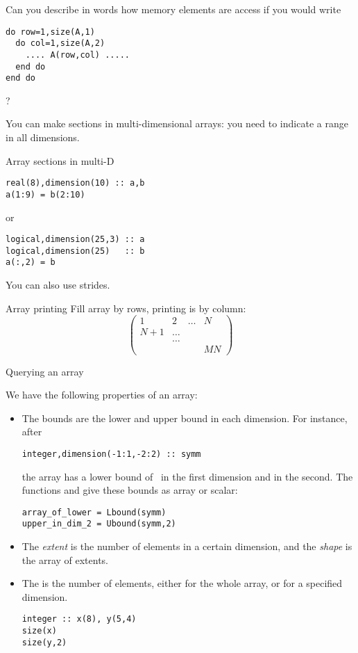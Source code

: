 \begin{exercise}
  Can you describe in words how memory elements are access if you
  would write
\begin{lstlisting}
do row=1,size(A,1)
  do col=1,size(A,2)
    .... A(row,col) .....
  end do
end do
\end{lstlisting}
?
\end{exercise}

You can make sections in multi-dimensional arrays: you need to
indicate a range in all dimensions.

\begin{block}{Array sections in multi-D}
  \label{sl:farray-sectiond}
\begin{lstlisting}
real(8),dimension(10) :: a,b
a(1:9) = b(2:10)
\end{lstlisting}
or
\begin{lstlisting}
logical,dimension(25,3) :: a
logical,dimension(25)   :: b
a(:,2) = b
\end{lstlisting}
You can also use strides.
\end{block}

\begin{block}{Array printing}
  \label{sl:farray-print}
  Fill array by rows, printing is by column:
  \[ \begin{pmatrix}1&2&\ldots&N\\ N+1&\ldots\\ &\ldots\\ &&&MN
  \end{pmatrix}
  \]
  \scriptsize
\end{block}

 {Querying an array}
\label{sec:farray-query}

We have the following properties of an array:
\begin{itemize}
\item The bounds are the lower and upper bound in each dimension.
  For instance, after
\begin{lstlisting}
integer,dimension(-1:1,-2:2) :: symm
\end{lstlisting}
the array  has a lower bound of~ in the first dimension
and  in the second. The functions  and
 give these bounds as array or scalar:
\begin{lstlisting}
array_of_lower = Lbound(symm)
upper_in_dim_2 = Ubound(symm,2)
\end{lstlisting}


\item The \emph{extent} is the number
  of elements in a certain dimension, and the
  \emph{shape} is the array of extents.

\item The  is the number of elements, either for
  the whole array, or for a specified dimension.
\begin{lstlisting}
integer :: x(8), y(5,4)
size(x)
size(y,2)
\end{lstlisting}
\end{itemize}

